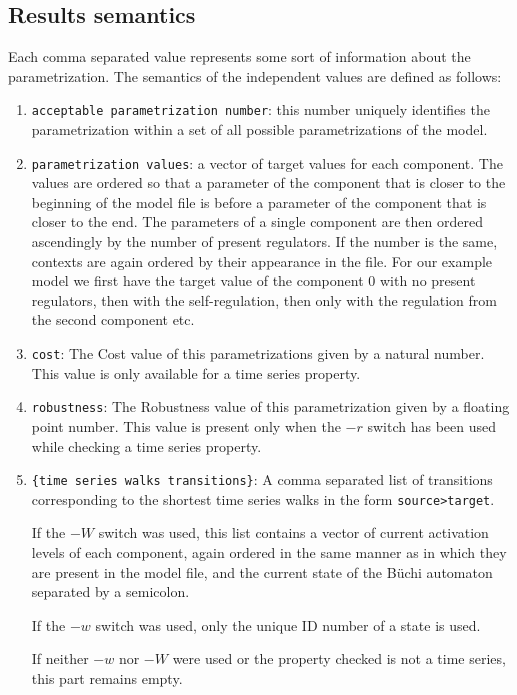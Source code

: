 \documentclass[12pt]{article}
\begin{document}
\subsection{Results semantics}
Each comma separated value represents some sort of information about the parametrization. The semantics of the independent values are defined as follows:
\begin{enumerate}
\item \texttt{ac\-cept\-able pa\-ra\-met\-riz\-a\-tion num\-ber}: this number uniquely identifies the pa\-ra\-met\-ri\-za\-tion within a set of all possible parametrizations of the model.
\item \texttt{pa\-ra\-met\-riz\-a\-tion values}: a vector of target values for each component. The values are ordered so that a parameter of the component that is closer to the beginning of the model file is before a parameter of the component that is closer to the end. The parameters of a single component are then ordered ascendingly by the number of present regulators. If the number is the same, contexts are again ordered by their appearance in the file. For our example model we first have the target value of the component $0$ with no present regulators, then with the self-regulation, then only with the regulation from the second component etc.
\item \texttt{cost}: The \textrm{Cost} value of this parametrizations given by a natural number. This value is only available for a time series property.
\item \texttt{ro\-bust\-ness}: The \textrm{Robustness} value of this parametrization given by a floating point number. This value is present only when the $-r$ switch has been used while checking a time series property.
\item \texttt{\{time se\-ries walks tran\-si\-tions\}}: A comma separated list of transitions corresponding to the shortest time series walks in the form \texttt{source>target}. 

If the $-W$ switch was used, this list contains a vector of current activation levels of each component, again ordered in the same manner as in which they are present in the model file, and the current state of the B\"uchi automaton separated by a semicolon. 

If the $-w$ switch was used, only the unique ID number of a state is used.

If neither $-w$ nor $-W$ were used or the property checked is not a time series, this part remains empty.
\end{enumerate}
\end{document}

